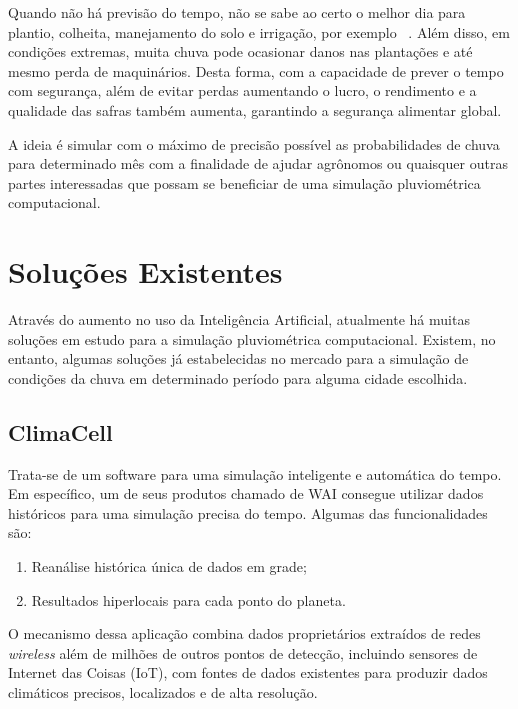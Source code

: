 Quando não há previsão do tempo, não se sabe ao certo o melhor dia para plantio, 
colheita, manejamento do solo e irrigação, por exemplo ~\cite{artigo_importancia}. Além disso, em condições extremas, muita chuva pode ocasionar danos nas plantações e até mesmo perda de maquinários.
Desta forma, com a capacidade de prever o tempo com segurança, além de evitar perdas aumentando o lucro, o rendimento e a qualidade das safras também aumenta, garantindo a segurança alimentar global.

A ideia é simular com o máximo de precisão possível as probabilidades de chuva para determinado mês com a finalidade de ajudar agrônomos ou quaisquer outras partes interessadas que possam se beneficiar de uma simulação pluviométrica computacional.

\section{Soluções Existentes}
\label{s.solucoes}

Através do aumento no uso da Inteligência Artificial, atualmente há muitas soluções em estudo para a simulação pluviométrica computacional. Existem, no entanto, algumas soluções já estabelecidas no mercado para a simulação de condições da chuva em determinado período para alguma cidade escolhida.

\subsection{ClimaCell}
\label{ss.climacell}
Trata-se de um software para uma simulação inteligente e automática do tempo. Em específico, um de seus produtos chamado de WAI consegue utilizar dados históricos para uma simulação precisa do tempo. Algumas das funcionalidades são:
\begin{enumerate}
  \item Reanálise histórica única de dados em grade;
  \item Resultados hiperlocais para cada ponto do planeta.
\end{enumerate}

O mecanismo dessa aplicação combina dados proprietários extraídos de redes \emph{wireless} além de milhões de outros pontos de detecção, incluindo sensores de Internet das Coisas (IoT), com fontes de dados existentes para produzir dados climáticos precisos, localizados e de alta resolução.

